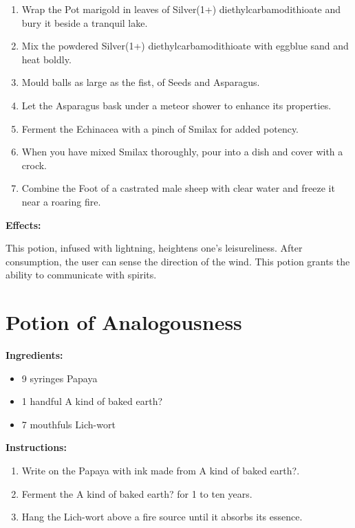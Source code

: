\documentclass{article}
\begin{document}
\begin{enumerate}
  \item Wrap the Pot marigold in leaves of Silver(1+) diethylcarbamodithioate and bury it beside a tranquil lake.
  \item Mix the powdered Silver(1+) diethylcarbamodithioate with eggblue sand and heat boldly.
  \item Mould balls as large as the fist, of Seeds and Asparagus.
  \item Let the Asparagus bask under a meteor shower to enhance its properties.
  \item Ferment the Echinacea with a pinch of Smilax for added potency.
  \item When you have mixed Smilax thoroughly, pour into a dish and cover with a crock.
  \item Combine the Foot of a castrated male sheep with clear water and freeze it near a roaring fire.
\end{enumerate}

\textbf{Effects:}

This potion, infused with lightning, heightens one's leisureliness. After consumption, the user can sense the direction of the wind. This potion grants the ability to communicate with spirits.

\newpage
\section*{Potion of Analogousness}

\textbf{Ingredients:}

\begin{itemize}
  \item 9 syringes Papaya
  \item 1 handful A kind of baked earth?
  \item 7 mouthfuls Lich-wort
\end{itemize}

\textbf{Instructions:}

\begin{enumerate}
  \item Write on the Papaya with ink made from A kind of baked earth?.
  \item Ferment the A kind of baked earth? for 1 to ten years.
  \item Hang the Lich-wort above a fire source until it absorbs its essence.
\end{enumerate}
\end{document}
